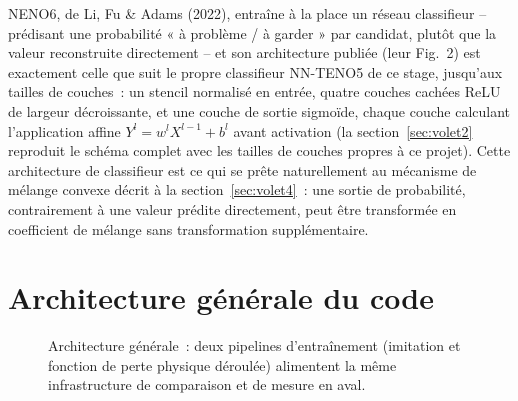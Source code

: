 \documentclass[11pt]{article}
\begin{document}
NENO6, de Li, Fu \& Adams (2022), entraîne à la place un réseau
classifieur -- prédisant une probabilité « à problème / à garder » par
candidat, plutôt que la valeur reconstruite directement -- et son
architecture publiée (leur Fig.~2) est exactement celle que suit le
propre classifieur NN-TENO5 de ce stage, jusqu'aux tailles de couches~:
un stencil normalisé en entrée, quatre couches cachées ReLU de largeur
décroissante, et une couche de sortie sigmoïde, chaque couche calculant
l'application affine $Y^l = w^l X^{l-1} + b^l$ avant activation (la
section~\ref{sec:volet2} reproduit le schéma complet avec les tailles de
couches propres à ce projet). Cette architecture de classifieur est ce
qui se prête naturellement au mécanisme de mélange convexe décrit à la
section~\ref{sec:volet4}~: une sortie de probabilité, contrairement à une
valeur prédite directement, peut être transformée en coefficient de
mélange sans transformation supplémentaire.

\section{Architecture générale du code}

\begin{figure}[htbp]
\centering
{}
\caption{Architecture générale~: deux pipelines d'entraînement (imitation
et fonction de perte physique déroulée) alimentent la même infrastructure
de comparaison et de mesure en aval.}
\end{figure}
\end{document}

